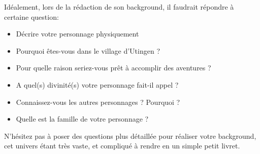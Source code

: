 \documentclass[10pt,a4paper]{book}
\begin{document}
Idéalement, lors de la rédaction de son background, il faudrait répondre à certaine question:
\begin{itemize}
\item Décrire votre personnage physiquement
\item Pourquoi êtes-vous dans le village d'Utingen ?
\item Pour quelle raison seriez-vous prêt à accomplir des aventures ?
\item A quel(s) divinité(s) votre personnage fait-il appel ?
\item Connaissez-vous les autres personnages ? Pourquoi ?
\item Quelle est la famille de votre personnage ?
\end{itemize}
N'hésitez pas à poser des questions plus détaillée pour réaliser votre background, cet univers étant très vaste, et compliqué à rendre en un simple petit livret.
\end{document}
